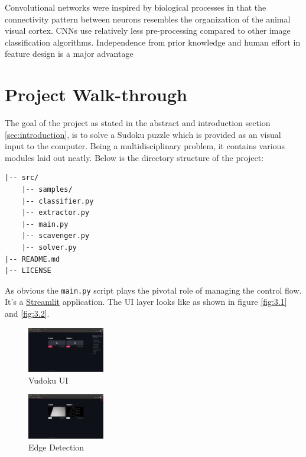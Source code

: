 \documentclass[twocolumn, switch]{article} %
\begin{document}
Convolutional networks were inspired by biological processes in that the connectivity pattern between neurons resembles the organization of the animal visual cortex. CNNs use relatively less pre-processing compared to other image classification algorithms. Independence from prior knowledge and human effort in feature design is a major advantage \cite{wiki:cnns}


\section{Project Walk-through}
\label{sec:projectwkt}
The goal of the project as stated in the abstract and introduction section \eqref{sec:introduction}, is to solve a Sudoku puzzle which is provided as an visual input to the computer. Being a multidisciplinary problem, it contains various modules laid out neatly. Below is the directory structure of the project: 

\begin{lstlisting}
|-- src/
    |-- samples/
    |-- classifier.py
    |-- extractor.py
    |-- main.py
    |-- scavenger.py
    |-- solver.py
|-- README.md
|-- LICENSE
\end{lstlisting}

As obvious the \lstinline{main.py} script plays the pivotal role of managing the control flow. It's a \href{https://github.com/streamlit/streamlit/}{Streamlit} application. The UI layer looks like as shown in figure \eqref{fig:3.1} and \eqref{fig:3.2}.

\begin{figure}[!htbp]
    \centering
    \includegraphics[width=0.3\textwidth]{wireframe_ui.png}
    \caption[Vudoku UI]{\centering Vudoku UI}
    \label{fig:3.1}
\end{figure}

\begin{figure}[!htbp]
    \centering
    \includegraphics[width=0.3\textwidth]{processing.png}
    \caption[Edge Detection]{\centering Edge Detection}
    \label{fig:3.2}
\end{figure}
\end{document}
